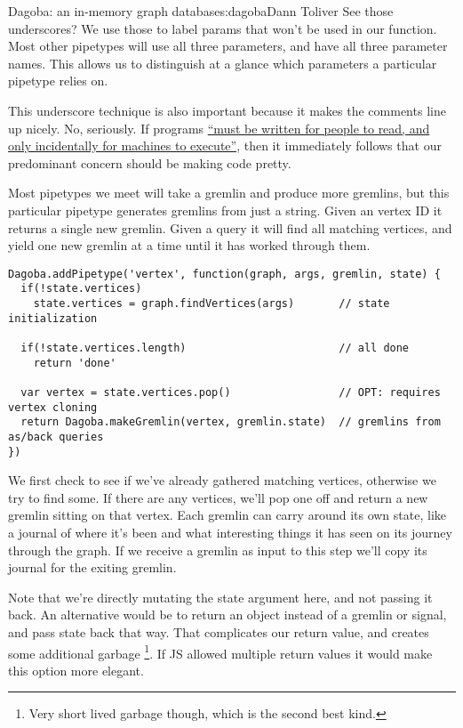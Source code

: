 \begin{aosachapter}{Dagoba: an in-memory graph database}{s:dagoba}{Dann Toliver}
See those underscores? We use those to label params that won't be used
in our function. Most other pipetypes will use all three parameters, and
have all three parameter names. This allows us to distinguish at a
glance which parameters a particular pipetype relies on.

This underscore technique is also important because it makes the
comments line up nicely. No, seriously. If programs
\href{https://mitpress.mit.edu/sicp/front/node3.html}{``must be written
for people to read, and only incidentally for machines to execute''},
then it immediately follows that our predominant concern should be
making code pretty.

\label{vertex}

Most pipetypes we meet will take a gremlin and produce more gremlins,
but this particular pipetype generates gremlins from just a string.
Given an vertex ID it returns a single new gremlin. Given a query it
will find all matching vertices, and yield one new gremlin at a time
until it has worked through them.

\begin{verbatim}
Dagoba.addPipetype('vertex', function(graph, args, gremlin, state) {
  if(!state.vertices)
    state.vertices = graph.findVertices(args)       // state initialization

  if(!state.vertices.length)                        // all done
    return 'done'

  var vertex = state.vertices.pop()                 // OPT: requires vertex cloning
  return Dagoba.makeGremlin(vertex, gremlin.state)  // gremlins from as/back queries
})
\end{verbatim}

We first check to see if we've already gathered matching vertices,
otherwise we try to find some. If there are any vertices, we'll pop one
off and return a new gremlin sitting on that vertex. Each gremlin can
carry around its own state, like a journal of where it's been and what
interesting things it has seen on its journey through the graph. If we
receive a gremlin as input to this step we'll copy its journal for the
exiting gremlin.

Note that we're directly mutating the state argument here, and not
passing it back. An alternative would be to return an object instead of
a gremlin or signal, and pass state back that way. That complicates our
return value, and creates some additional garbage \footnote{Very short
  lived garbage though, which is the second best kind.}. If JS allowed
multiple return values it would make this option more elegant.


\end{aosachapter}
